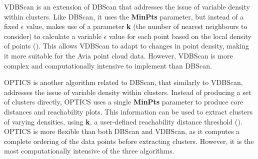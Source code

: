 \ac{VDBScan} is an extension of \ac{DBScan} that addresses the issue of variable density within clusters. Like \ac{DBScan}, it uses the \textbf{MinPts} parameter, but instead of a fixed \textbf{$\epsilon$} value, makes use of a parameter \textbf{k} (the number of nearest neighbours to consider) to calculate a variable \textbf{$\epsilon$} value for each point based on the local density of points (\cite{liuVDBSCANVariedDensity2007}). This allows \ac{VDBScan} to adapt to changes in point density, making it more suitable for the Avia point cloud data. However, \ac{VDBScan} is more complex and computationally intensive to implement than \ac{DBScan}.

\ac{OPTICS} is another algorithm related to \ac{DBScan}, that similarly to \ac{VDBScan}, addresses the issue of variable density within clusters. Instead of producing a set of clusters directly, \ac{OPTICS} uses a single \textbf{MinPts} parameter to produce core distances and reachability plots. This information can be used to extract clusters of varying densities, using \textbf{k}, a user-defined reachability distance threshold (\cite{ankerstOPTICSOrderingPoints1999}). \ac{OPTICS} is more flexible than both \ac{DBScan} and \ac{VDBScan}, as it computes a complete ordering of the data points before extracting clusters. However, it is the most computationally intensive of the three algorithms.

